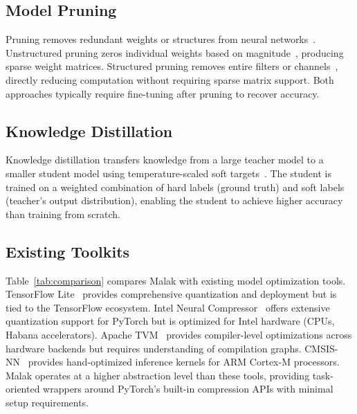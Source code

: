 \documentclass[10pt,twocolumn]{article}
\begin{document}
\subsection{Model Pruning}

Pruning removes redundant weights or structures from neural networks~\cite{model-compression-survey}.
Unstructured pruning zeros individual weights based on magnitude~\cite{lottery-ticket}, producing sparse weight matrices.
Structured pruning removes entire filters or channels~\cite{structured-pruning}, directly reducing computation without requiring sparse matrix support.
Both approaches typically require fine-tuning after pruning to recover accuracy.

\subsection{Knowledge Distillation}

Knowledge distillation transfers knowledge from a large teacher model to a smaller student model using temperature-scaled soft targets~\cite{distillation}.
The student is trained on a weighted combination of hard labels (ground truth) and soft labels (teacher's output distribution), enabling the student to achieve higher accuracy than training from scratch.

\subsection{Existing Toolkits}

Table~\ref{tab:comparison} compares Malak with existing model optimization tools.
TensorFlow Lite~\cite{tflite} provides comprehensive quantization and deployment but is tied to the TensorFlow ecosystem.
Intel Neural Compressor~\cite{intel-nc} offers extensive quantization support for PyTorch but is optimized for Intel hardware (CPUs, Habana accelerators).
Apache TVM~\cite{tvm} provides compiler-level optimizations across hardware backends but requires understanding of compilation graphs.
CMSIS-NN~\cite{cmsis-nn} provides hand-optimized inference kernels for ARM Cortex-M processors.
Malak operates at a higher abstraction level than these tools, providing task-oriented wrappers around PyTorch's built-in compression APIs with minimal setup requirements.
\end{document}
